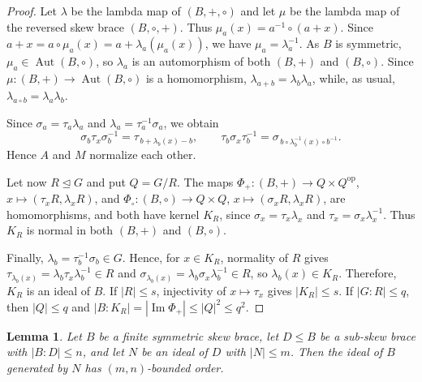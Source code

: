 \documentclass[10pt,a4paper]{amsart}
\numberwithin{equation}{section}
\newtheorem{lem}[equation]{Lemma}
\newcommand{\Aut}{\operatorname{Aut} }
\begin{document}
\begin{proof}
Let $\lambda$ be the lambda map of $(B,+,\circ)$ and let $\mu$ be the lambda map of the reversed skew brace $(B,\circ,+)$. Thus $\mu_a(x)=a^{-1}\circ(a+x)$. Since $a+x=a\circ\mu_a(x)=a+\lambda_a(\mu_a(x))$, we have $\mu_a=\lambda_a^{-1}$. As $B$ is symmetric, $\mu_a\in\Aut(B,\circ)$, so $\lambda_a$ is an automorphism of both $(B,+)$ and $(B,\circ)$. Since $\mu:(B,+)\to\Aut(B,\circ)$ is a homomorphism, $\lambda_{a+b}=\lambda_b\lambda_a$, while, as usual, $\lambda_{a\circ b}=\lambda_a\lambda_b$.

Since $\sigma_a=\tau_a\lambda_a$ and $\lambda_a=\tau_a^{-1}\sigma_a$, we obtain
$$
\sigma_b\tau_x\sigma_b^{-1}=\tau_{\,b+\lambda_b(x)-b},\qquad
\tau_b\sigma_x\tau_b^{-1}=\sigma_{\,b\circ\lambda_b^{-1}(x)\circ b^{-1}}.
$$
Hence $A$ and $M$ normalize each other.

Let now $R\unlhd G$ and put $Q=G/R$. The maps $\Phi_+:(B,+)\to Q\times Q^{\mathrm{op}}$, $x\mapsto(\tau_xR,\lambda_xR)$, and $\Phi_\circ:(B,\circ)\to Q\times Q$, $x\mapsto(\sigma_xR,\lambda_xR)$, are homomorphisms, and both have kernel $K_R$, since $\sigma_x=\tau_x\lambda_x$ and $\tau_x=\sigma_x\lambda_x^{-1}$. Thus $K_R$ is normal in both $(B,+)$ and $(B,\circ)$.

Finally, $\lambda_b=\tau_b^{-1}\sigma_b\in G$. Hence, for $x\in K_R$, normality of $R$ gives $\tau_{\lambda_b(x)}=\lambda_b\tau_x\lambda_b^{-1}\in R$ and $\sigma_{\lambda_b(x)}=\lambda_b\sigma_x\lambda_b^{-1}\in R$, so $\lambda_b(x)\in K_R$. Therefore, $K_R$ is an ideal of $B$. If $|R|\leqslant s$, injectivity of $x\mapsto\tau_x$ gives $|K_R|\leqslant s$. If $|G:R|\leqslant q$, then $|Q|\leqslant q$ and $|B:K_R|=|\operatorname{Im}\Phi_+|\leqslant |Q|^2\leqslant q^2$.
\end{proof}

\begin{lem}\label{lem:bounded-ideal-closure-symmetric}
Let $B$ be a finite symmetric skew brace, let $D\leqslant B$ be a sub-skew brace with $|B:D|\leqslant n$, and let $N$ be an ideal of $D$ with $|N|\leqslant m$. Then the ideal of $B$ generated by $N$ has $(m,n)$-bounded order.
\end{lem}
\end{document}
